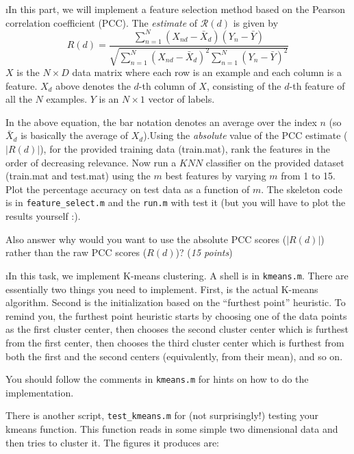 \documentclass[fleqn]{article}
\begin{document}
\i In this part, we will implement a feature selection method based on
the Pearson correlation coefficient (PCC). The \textit{estimate} of 
$\mathcal{R}(d)$ is given by
\[
  R(d) = \frac{\sum_{n=1}^N (X_{nd} - \bar{X}_{d})(Y_n - \bar{Y})}
  {\sqrt{\sum_{n=1}^N (X_{nd} - \bar{X}_{d})^2\sum_{n=1}^N(Y_n - \bar{Y})^2}}
\]
$X$ is the $N\times D$ data matrix where each row is an example and each
column is a feature. $X_d$ above denotes the $d$-th column of $X$, consisting
of the $d$-th feature of all the $N$ examples. $Y$ is an $N\times 1$ vector
of labels.

In the above equation, the bar notation denotes an average over the index $n$
(so $\bar{X}_{d}$ is basically the average of $X_d$).Using the \textit{absolute} 
value of the PCC estimate ($|R(d)|$), for the provided training data (train.mat), rank the features in 
the order of decreasing relevance. Now run a $KNN$ classifier on the provided dataset
(train.mat and test.mat) using the $m$ best features by varying $m$ from 1 to 15. 
Plot the percentage accuracy on test data as a function of $m$. The skeleton code is 
in \texttt{feature\_select.m} and the \texttt{run.m} with test it (but you will have to 
plot the results yourself :). 

Also answer why would you want to use the absolute PCC scores ($|R(d)|$) rather than the 
raw PCC scores ($R(d)$)? (\textit{15 points}) 

\i In this task, we implement K-means clustering. A shell is in \texttt{kmeans.m}. 
There are essentially two things you need to implement. First, is the actual 
K-means algorithm. Second is the initialization based on the ``furthest point'' 
heuristic. To remind you, the furthest point heuristic starts by
choosing one of the data points as the first cluster center, then chooses the
second cluster center which is furthest from the first center, then chooses 
the third cluster center which is furthest from both the first and the second 
centers (equivalently, from their mean), and so on.

You should follow the comments in \texttt{kmeans.m} for hints on how to do the 
implementation. 

There is another script, \texttt{test\_kmeans.m} for (not surprisingly!) testing 
your kmeans function. This function reads in some simple two dimensional data and 
then tries to cluster it. The figures it produces are:
\end{document}
